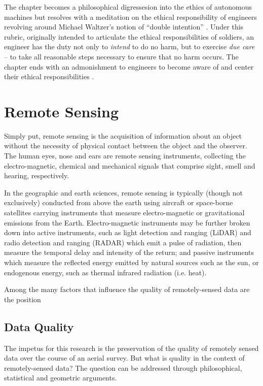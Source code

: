 \documentclass[10pt]{article}
\begin{document}
The chapter becomes a philosophical digressesion into the ethics of autonomous machines but resolves with a meditation on the ethical responsibility of engineers \cite[p.2873]{Valavanis2015bz} revolving around Michael Waltzer's notion of ``double intention'' \cite{Waltzer}. Under this rubric, originally intended to articulate the ethical responsibilities of soldiers, an engineer has the duty not only to \emph{intend} to do no harm, but to exercise \emph{due care} \cite{Lucas2011} -- to take all reasonable steps necessary to ensure that no harm occurs. The chapter ends with an admonishment to engineers to become aware of and center their ethical responsibilities \cite[p.2974]{Valavanis2015bz}.

\section{Remote Sensing}

Simply put, remote sensing is the acquisition of information about an object without the necessity of physical contact between the object and the observer. The human eyes, nose and ears are remote sensing instruments, collecting the electro-magnetic, chemical and mechanical signals that comprise sight, smell and hearing, respectively.

In the geographic and earth sciences, remote sensing is typically (though not exclusively) conducted from above the earth using aircraft or space-borne satellites carrying instruments that measure electro-magnetic or gravitational emissions from the Earth. Electro-magnetic instruments may be further broken down into active instruments, such as light detection and ranging (LiDAR) and radio detection and ranging (RADAR) which emit a pulse of radiation, then measure the temporal delay and intensity of the return; and passive instruments which measure the reflected energy emitted by natural sources such as the sun, or endogenous energy, such as thermal infrared radiation (i.e. heat).

Among the many factors that influence the quality of remotely-sensed data are the position


\subsection{Data Quality}

The impetus for this research is the preservation of the quality of remotely sensed data over the course of an aerial survey. But what is quality in the context of remotely-sensed data? The question can be addressed through philosophical, statistical and geometric arguments.
\end{document}
